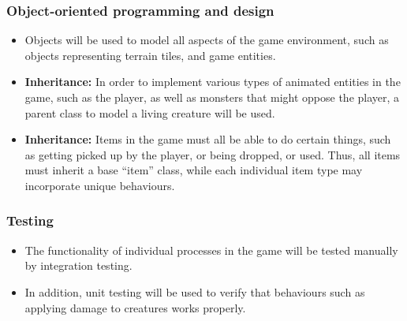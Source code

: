 \documentclass{article}
\begin{document}
\subsubsection{Object-oriented programming and design}
\begin{itemize}
    \item Objects will be used to model all aspects of the game environment, such as objects representing terrain tiles, and game entities.
    \item \textbf{Inheritance:} In order to implement various types of animated entities in the game, such as the player, as well as monsters that might oppose the player, a parent class to model a living creature will be used.
    \item \textbf{Inheritance:} Items in the game must all be able to do certain things, such as getting picked up by the player, or being dropped, or used. Thus, all items must inherit a base ``item'' class, while each individual item type may incorporate unique behaviours.
\end{itemize}
\subsubsection{Testing}
\begin{itemize}
    \item The functionality of individual processes in the game will be tested manually by integration testing.
    \item In addition, unit testing will be used to verify that behaviours such as applying damage to creatures works properly.
\end{itemize}
\end{document}
